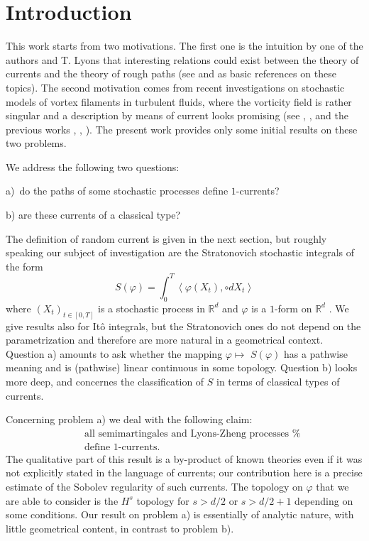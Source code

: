 \documentclass{article}
\begin{document}
\section{Introduction}

This work starts from two motivations. The first one is the intuition
by one of the authors 
 and T. Lyons that interesting relations could exist between the
theory of currents and the theory of rough paths (see \cite{GMS} and \cite
{Lyons} as basic references on these topics). The second motivation comes
from recent investigations on stochastic models of vortex
filaments in turbulent fluids, where the vorticity field is rather singular
and a description by means of current looks promising (see \cite{Ffil}, \cite
{FGub}, \cite{Ascona} and the previous works \cite{Ch}, \cite{Ga}, 
\cite{PLLMaj}). The present work provides only some initial results on these
two problems.

We address the following two questions:

\vspace{0.5cm}

a)\ do the paths of some stochastic processes define $1$-currents?

\vspace{0.5cm}

b) are these currents of a classical type?

\vspace{0.5cm}

The definition of random current is given in the next section, but roughly speaking
our subject of investigation are the Stratonovich stochastic integrals of
the form 
\begin{equation*}
S\left( \varphi \right) =\int_{0}^{T}\left\langle \varphi \left(
X_{t}\right) ,\circ dX_{t}\right\rangle
\end{equation*}
where $\left( X_{t}\right) _{t\in \left[ 0,T\right] }$ is a stochastic
process in $\mathbb{R}^{d}$ and $\varphi $ is a $1$-form on $\mathbb{R}^{d}$%
. We give results also for It\^{o} integrals, but the Stratonovich ones do
not depend on the parametrization and therefore are more natural in a
geometrical context. Question a) amounts to ask whether the mapping $\varphi
\mapsto $ $S\left( \varphi \right) $ has a pathwise meaning and is
(pathwise) linear continuous in some topology. Question b) looks more deep,
and concernes the classification of $S$ in terms of classical types of
currents.

Concerning problem a) we deal with the following claim: 
\begin{eqnarray*}
&&\text{all semimartingales and Lyons-Zheng processes
define }1\text{-currents.}
\end{eqnarray*}
The qualitative part of this result is a by-product of known theories
even if it was not explicitly stated in the language of currents; our
contribution here is a precise estimate of the Sobolev regularity of
such currents.
The topology on $\varphi $ that we are able to consider is the $H^{s}$
topology for $s> d/2$ or $s> d/2+1$ depending on some
conditions. Our result on problem a) is essentially of analytic nature,
with little geometrical content, in contrast to problem b).
\end{document}
